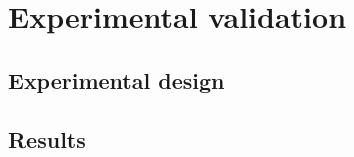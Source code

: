 \section{Experimental validation}\label{sec:experiments}

\subsection{Experimental design}

\subsection{Results}